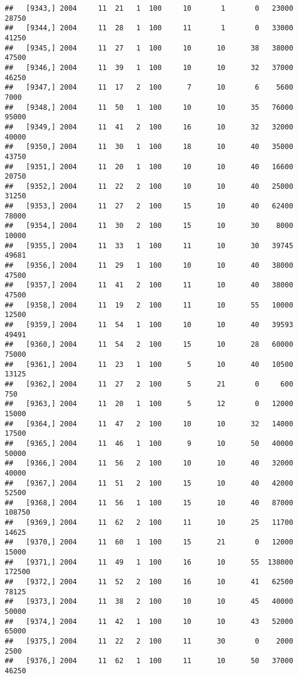 \documentclass{article}\usepackage[]{graphicx}\usepackage[]{color}
\makeatletter
\newenvironment{kframe}{%
 \def\at@end@of@kframe{}%
 \ifinner\ifhmode%
  \def\at@end@of@kframe{\end{minipage}}%
  \begin{minipage}{\columnwidth}%
 \fi\fi%
 \def\FrameCommand##1{\hskip\@totalleftmargin \hskip-\fboxsep
 \colorbox{shadecolor}{##1}\hskip-\fboxsep
     \hskip-\linewidth \hskip-\@totalleftmargin \hskip\columnwidth}%
 \MakeFramed {\advance\hsize-\width
   \@totalleftmargin\z@ \linewidth\hsize
   \@setminipage}}%
 {\par\unskip\endMakeFramed%
 \at@end@of@kframe}
\newenvironment{knitrout}{}{} %
\makeatother
\begin{document}
\begin{knitrout}
\begin{kframe}
\begin{verbatim}
##   [9343,] 2004     11  21   1  100     10       1       0   23000   28750
##   [9344,] 2004     11  28   1  100     11       1       0   33000   41250
##   [9345,] 2004     11  27   1  100     10      10      38   38000   47500
##   [9346,] 2004     11  39   1  100     10      10      32   37000   46250
##   [9347,] 2004     11  17   2  100      7      10       6    5600    7000
##   [9348,] 2004     11  50   1  100     10      10      35   76000   95000
##   [9349,] 2004     11  41   2  100     16      10      32   32000   40000
##   [9350,] 2004     11  30   1  100     18      10      40   35000   43750
##   [9351,] 2004     11  20   1  100     10      10      40   16600   20750
##   [9352,] 2004     11  22   2  100     10      10      40   25000   31250
##   [9353,] 2004     11  27   2  100     15      10      40   62400   78000
##   [9354,] 2004     11  30   2  100     15      10      30    8000   10000
##   [9355,] 2004     11  33   1  100     11      10      30   39745   49681
##   [9356,] 2004     11  29   1  100     10      10      40   38000   47500
##   [9357,] 2004     11  41   2  100     11      10      40   38000   47500
##   [9358,] 2004     11  19   2  100     11      10      55   10000   12500
##   [9359,] 2004     11  54   1  100     10      10      40   39593   49491
##   [9360,] 2004     11  54   2  100     15      10      28   60000   75000
##   [9361,] 2004     11  23   1  100      5      10      40   10500   13125
##   [9362,] 2004     11  27   2  100      5      21       0     600     750
##   [9363,] 2004     11  20   1  100      5      12       0   12000   15000
##   [9364,] 2004     11  47   2  100     10      10      32   14000   17500
##   [9365,] 2004     11  46   1  100      9      10      50   40000   50000
##   [9366,] 2004     11  56   2  100     10      10      40   32000   40000
##   [9367,] 2004     11  51   2  100     15      10      40   42000   52500
##   [9368,] 2004     11  56   1  100     15      10      40   87000  108750
##   [9369,] 2004     11  62   2  100     11      10      25   11700   14625
##   [9370,] 2004     11  60   1  100     15      21       0   12000   15000
##   [9371,] 2004     11  49   1  100     16      10      55  138000  172500
##   [9372,] 2004     11  52   2  100     16      10      41   62500   78125
##   [9373,] 2004     11  38   2  100     10      10      45   40000   50000
##   [9374,] 2004     11  42   1  100     10      10      43   52000   65000
##   [9375,] 2004     11  22   2  100     11      30       0    2000    2500
##   [9376,] 2004     11  62   1  100     11      10      50   37000   46250

\end{verbatim}
\end{kframe}
\end{knitrout}
\end{document}

